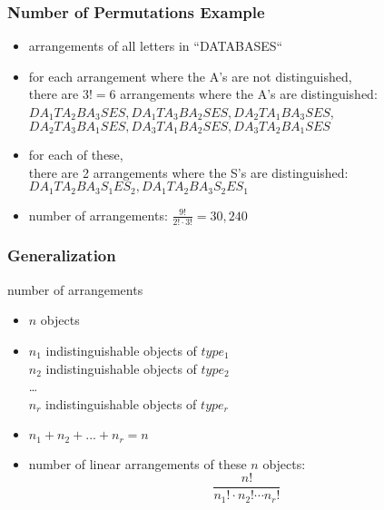 \documentclass[dvipsnames]{beamer}
\begin{document}
\begin{frame}
  \frametitle{Number of Permutations Example}

  \begin{example}
    \begin{itemize}
      \item arrangements of all letters in ``DATABASES``

      \pause
      \medskip
      \item for each arrangement where the A's are not distinguished,\\
        there are $3! = 6$ arrangements where the A's are distinguished:\\
        \smallskip
        $DA_{1}TA_{2}BA_{3}SES,DA_{1}TA_{3}BA_{2}SES, DA_{2}TA_{1}BA_{3}SES$,\\
        $DA_{2}TA_{3}BA_{1}SES, DA_{3}TA_{1}BA_{2}SES, DA_{3}TA_{2}BA_{1}SES$

      \pause
      \item for each of these,\\
        there are 2 arrangements where the S's are distinguished:\\
        \smallskip
        $DA_{1}TA_{2}BA_{3}S_{1}ES_{2},DA_{1}TA_{2}BA_{3}S_{2}ES_{1}$

      \pause
      \medskip
      \item number of arrangements: $\frac{9!}{2! \cdot 3!} = 30,240$
   \end{itemize}
  \end{example}
\end{frame}

\begin{frame}
  \frametitle{Generalization}
  
  \begin{block}{number of arrangements}
    \begin{itemize}
      \item $n$ objects
      \item $n_1$ indistinguishable objects of $type_1$\\
        $n_2$ indistinguishable objects of $type_2$\\
        \ldots\\
        $n_r$ indistinguishable objects of $type_r$
      \item $n_1 + n_2 + ... + n_r = n$

      \medskip
      \item number of linear arrangements of these $n$ objects:
      \begin{equation*}
        \frac{n!}{n_1! \cdot n_2! \cdots n_r!}
      \end{equation*}
    \end{itemize}
  \end{block}
\end{frame}
\end{document}
